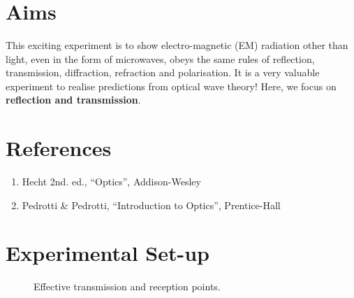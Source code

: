 \documentclass{article}
\begin{document}
\title{ }
\author{ }
\maketitle

\section*{Aims}

This exciting experiment is to show electro-magnetic (EM) radiation
other than light, even in the form of microwaves, obeys the same rules
of reflection, transmission, diffraction, refraction and
polarisation. It is a very valuable experiment to realise predictions
from optical wave theory! Here, we focus on \textbf{reflection and
  transmission}.
\begin{center}
\end{center}
\section*{References}

\begin{enumerate}
\item  Hecht 2nd. ed., ``Optics'', Addison-Wesley\label{Hecht}
\item Pedrotti \& Pedrotti, ``Introduction to Optics'', Prentice-Hall
\end{enumerate}
\section*{Experimental Set-up}
\begin{figure}[!h]
\begin{centering}

\caption{\label{fig:effective}Effective transmission and reception points.}
\end{centering}
\end{figure}
\end{document}

